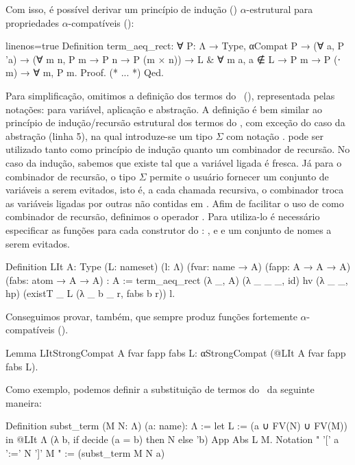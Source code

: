 Com isso, é possível derivar um princípio de indução () $\alpha$-estrutural para propriedades $\alpha$-compatíveis ():
\begin{coqcode*}{linenos=true}
Definition term_aeq_rect:
  ∀ P: Λ → Type, αCompat P →
    (∀ a, P 'a) →
    (∀ m n, P m → P n → P (m × n)) →
    {L & ∀ m a, a ∉ L → P m → P (\a ⋅ m)} →
    ∀ m, P m.
Proof. (* ... *) Qed.
\end{coqcode*}
Para simplificação, omitimos a definição dos termos do \lcalc~(), representada pelas notações:  para variável,  aplicação e  abstração. A definição  é bem similar ao princípio de indução/recursão estrutural dos termos do \lcalc, com exceção do caso da abstração (linha 5), na qual introduze-se um tipo $\Sigma$ com notação .  pode ser utilizado tanto como princípio de indução quanto um combinador de recursão. No caso da indução, sabemos que existe  tal que a variável ligada é fresca. Já para o combinador de recursão, o tipo $\Sigma$ permite o usuário fornecer um conjunto de variáveis a serem evitados, isto é, a cada chamada recursiva, o combinador troca as variáveis ligadas por outras não contidas em . Afim de facilitar o uso de  como combinador de recursão, definimos o operador . Para utiliza-lo é necessário especificar as funções para cada construtor do \lcalc: ,  e  e um conjunto  de nomes a serem evitados.
\begin{coqcode}
Definition LIt {A: Type} (L: nameset) (l: Λ)
           (fvar: name → A) (fapp: A → A → A) (fabs: atom → A → A) : A :=
  term_aeq_rect (λ _, A) (λ _ _ _, id) hv (λ _ _, hp)
                (existT _ L (λ _ b _ r, fabs b r)) l.
\end{coqcode}
Conseguimos provar, também, que  sempre produz funções fortemente $\alpha$-compatíveis ().
\begin{coqcode}
Lemma LItStrongCompat {A} fvar fapp fabs L:
  αStrongCompat (@LIt A fvar fapp fabs L).
\end{coqcode}
Como exemplo, podemos definir a substituição de termos do \lcalc~da seguinte maneira:
\begin{coqcode}
Definition subst_term (M N: Λ) (a: name): Λ :=
  let L := ({a} ∪ FV(N) ∪ FV(M)) in
  @LIt Λ (λ b, if decide (a = b) then N else 'b) App Abs L M.
Notation " '[' a ':=' N ']' M " := (subst_term M N a)
\end{coqcode}
